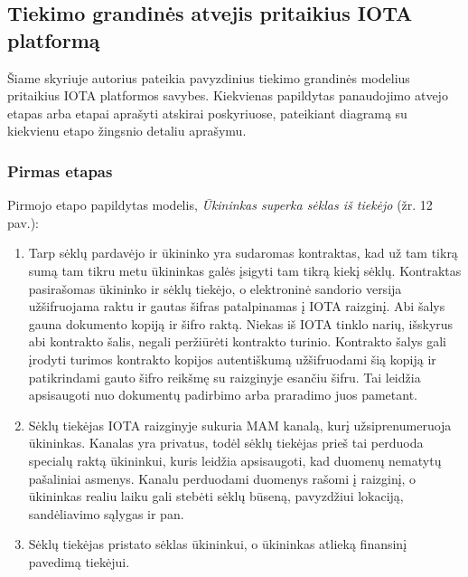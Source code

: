 \subsection{Tiekimo grandinės atvejis pritaikius IOTA platformą}

Šiame skyriuje autorius pateikia pavyzdinius tiekimo grandinės modelius pritaikius IOTA platformos savybes. Kiekvienas papildytas panaudojimo atvejo etapas arba etapai aprašyti atskirai poskyriuose, pateikiant diagramą su kiekvienu etapo žingsnio detaliu aprašymu.




\subsubsection{Pirmas etapas}

Pirmojo etapo papildytas modelis, \textit{Ūkininkas superka sėklas iš tiekėjo} (žr. 12 pav.):
\begin{enumerate}
    \item Tarp sėklų pardavėjo ir ūkininko yra sudaromas kontraktas, kad už tam tikrą sumą tam tikru metu ūkininkas galės įsigyti tam tikrą kiekį sėklų. Kontraktas pasirašomas ūkininko ir sėklų tiekėjo, o elektroninė sandorio versija užšifruojama raktu ir gautas šifras patalpinamas į IOTA raizginį. Abi šalys gauna dokumento kopiją ir šifro raktą. Niekas iš IOTA tinklo narių, išskyrus abi kontrakto šalis, negali peržiūrėti kontrakto turinio. Kontrakto šalys gali įrodyti turimos kontrakto kopijos autentiškumą užšifruodami šią kopiją ir patikrindami gauto šifro reikšmę su raizginyje esančiu šifru. Tai leidžia apsisaugoti nuo dokumentų padirbimo arba praradimo juos pametant. 
    \item Sėklų tiekėjas IOTA raizginyje sukuria MAM kanalą, kurį užsiprenumeruoja ūkininkas. Kanalas yra privatus, todėl sėklų tiekėjas prieš tai perduoda specialų raktą ūkininkui, kuris leidžia apsisaugoti, kad duomenų nematytų pašaliniai asmenys. Kanalu perduodami duomenys rašomi į raizginį, o ūkininkas realiu laiku gali stebėti sėklų būseną, pavyzdžiui lokaciją, sandėliavimo sąlygas ir pan.
    \item Sėklų tiekėjas pristato sėklas ūkininkui, o ūkininkas atlieką finansinį pavedimą tiekėjui.
\end{enumerate}

